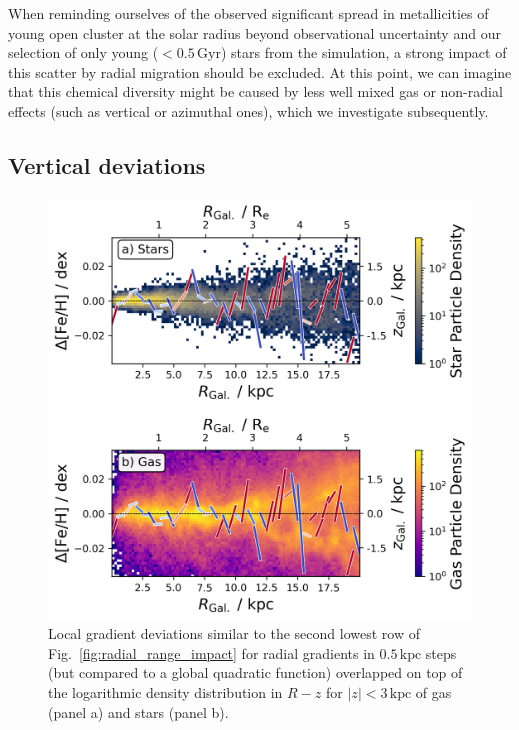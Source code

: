 \documentclass[fleqn,usenatbib]{mnras}
\newcommand{\nihaoAGEmax}{$0.5\,\mathrm{Gyr}$}
\begin{document}
When reminding ourselves of the observed significant spread in metallicities of young open cluster at the solar radius beyond observational uncertainty \citep[e.g.][]{Donor2020, Spina2021} and our selection of only young ($<$\nihaoAGEmax) stars from the simulation, a strong impact of this scatter by radial migration should be excluded. At this point, we can imagine that this chemical diversity might be caused by less well mixed gas or non-radial effects (such as vertical or azimuthal ones), which we investigate subsequently.

\subsection{Vertical deviations}
\label{sec:coherence_vertical_radial_metallicity_gradients}

\begin{figure}
    \centering
    \includegraphics[width=\columnwidth]{figures/overlap_local_variation_gas.png}
    \caption{Local gradient deviations similar to the second lowest row of Fig.~\ref{fig:radial_range_impact} for radial gradients in $0.5\,\mathrm{kpc}$ steps (but compared to a global quadratic function) overlapped on top of the logarithmic density distribution in $R-z$ for $\vert z \vert < 3\,\mathrm{kpc}$ of gas (panel a) and stars (panel b).}
    \label{fig:overlap_local_variation_gas}
\end{figure}
\end{document}
